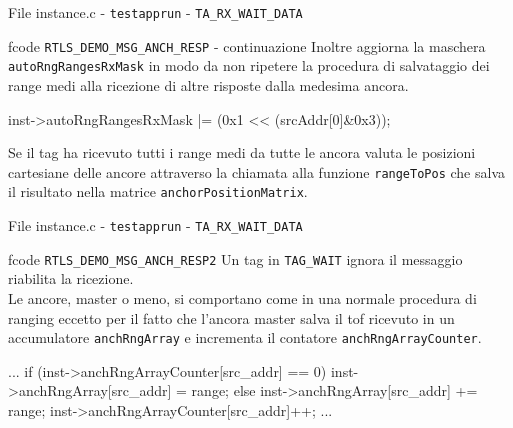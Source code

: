 \begin{frame}[fragile, shrink=15]{File instance.c - \lstinline[language=C]!testapprun! - \lstinline[language=C]!TA_RX_WAIT_DATA!}
  \begin{block}{fcode \lstinline[language=C]!RTLS_DEMO_MSG_ANCH_RESP! - continuazione}
    Inoltre aggiorna la maschera \lstinline[language=C]!autoRngRangesRxMask! in modo da non ripetere
    la procedura di salvataggio dei range medi alla ricezione di altre risposte dalla medesima ancora.
    \begin{C}
        inst->autoRngRangesRxMask |= (0x1 << (srcAddr[0]&0x3));
    \end{C}
    Se il tag ha ricevuto tutti i range medi da tutte le ancora valuta le posizioni cartesiane
    delle ancore attraverso la chiamata alla funzione \lstinline[language=C]!rangeToPos! che salva il risultato
    nella matrice \lstinline[language=C]!anchorPositionMatrix!.
    \begin{C}
        if (inst->autoRngRangesRxMask  == (0x1 << MAX_ANCHOR_LIST_SIZE) - 1)
        {
          rangesToPos(inst->autoRngRangesArray,\
          inst->anchorPositionMatrix);
        }
      }
      ...
    \end{C}
  \end{block}
\end{frame}

\begin{frame}[fragile, shrink=15]{File instance.c - \lstinline[language=C]!testapprun! - \lstinline[language=C]!TA_RX_WAIT_DATA!}
  \begin{block}{fcode \lstinline[language=C]!RTLS_DEMO_MSG_ANCH_RESP2!}
    Un tag in \lstinline[language=C]!TAG_WAIT! ignora il messaggio riabilita la ricezione.\\
    Le ancore, master o meno, si comportano come in una normale procedura di ranging
    eccetto per il fatto che l'ancora master salva il tof ricevuto in un accumulatore
    \lstinline[language=C]!anchRngArray! e incrementa il contatore \lstinline[language=C]!anchRngArrayCounter!.
    \begin{C}
      ...
      if (inst->anchRngArrayCounter[src_addr] == 0)
        inst->anchRngArray[src_addr] = range;
      else 
        inst->anchRngArray[src_addr] += range;
      inst->anchRngArrayCounter[src_addr]++;
      ...
    \end{C}
  \end{block}
\end{frame}

